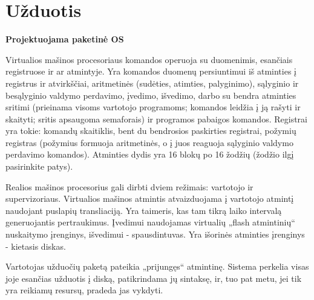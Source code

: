 \section{Užduotis}
\textbf{Projektuojama paketinė OS}

Virtualios mašinos procesoriaus komandos operuoja su duomenimis, esančiais registruose ir ar atmintyje. Yra komandos duomenų persiuntimui iš atminties į registrus ir atvirkščiai, aritmetinės (sudėties, atimties, palyginimo), sąlyginio ir besąlyginio valdymo perdavimo, įvedimo, išvedimo, darbo su bendra atminties sritimi (prieinama visoms vartotojo programoms; komandos leidžia į ją rašyti ir skaityti; sritis apsaugoma semaforais) ir programos pabaigos komandos. Registrai yra tokie: komandų skaitiklis, bent du bendrosios paskirties registrai, požymių registras (požymius formuoja aritmetinės, o į juos reaguoja sąlyginio valdymo perdavimo komandos). Atminties dydis yra 16 blokų po 16 žodžių (žodžio ilgį pasirinkite patys).

Realios mašinos procesorius gali dirbti dviem režimais: vartotojo ir supervizoriaus. Virtualios mašinos atmintis atvaizduojama į vartotojo atmintį naudojant puslapių transliaciją. Yra taimeris, kas tam tikrą laiko intervalą generuojantis pertraukimus. Įvedimui naudojamas virtualių „flash atmintinių“ nuskaitymo įrenginys, išvedimui - spausdintuvas. Yra išorinės atminties įrenginys - kietasis diskas.

Vartotojas užduočių paketą pateikia „prijungęs“ atmintinę. Sistema perkelia visas joje esančias užduotis į diską, patikrindama jų sintaksę, ir, tuo pat metu, jei tik yra reikiamų resursų, pradeda jas vykdyti.



